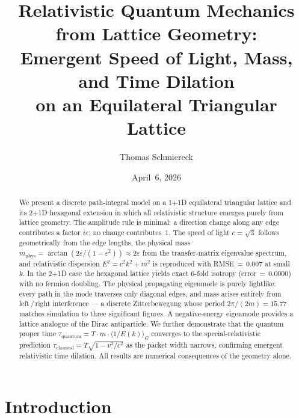 \documentclass[twocolumn,showpacs,preprintnumbers,amsmath,amssymb]{revtex4-2}
\newcommand{\eps}{\varepsilon}
\newcommand{\mphys}{m_{\mathrm{phys}}}
\newcommand{\tauq}{\tau_{\mathrm{quantum}}}
\newcommand{\taucl}{\tau_{\mathrm{classical}}}
\newcommand{\avg}[1]{\langle #1 \rangle}
\begin{document}

\title{Relativistic Quantum Mechanics from Lattice Geometry:\\
Emergent Speed of Light, Mass, and Time Dilation\\
on an Equilateral Triangular Lattice}

\author{Thomas Schmiereck}

\date{April~6, 2026}

\begin{abstract}
We present a discrete path-integral model on a \mbox{1\!+\!1D} equilateral
triangular lattice and its \mbox{2\!+\!1D} hexagonal extension in which all
relativistic structure emerges purely from lattice geometry.
The amplitude rule is minimal: a direction change along any edge contributes a
factor $i\eps$; no change contributes~$1$.
The speed of light $c = \sqrt{3}$ follows geometrically from the edge lengths,
the physical mass $\mphys = \arctan(2\eps/(1{-}\eps^2)) \approx 2\eps$ from
the transfer-matrix eigenvalue spectrum, and relativistic dispersion
$E^2 = c^2 k^2 + m^2$ is reproduced with RMSE\,$=\,0.007$ at small~$k$.
In the \mbox{2\!+\!1D} case the hexagonal lattice yields exact 6-fold isotropy
(error\,$=\,0.0000$) with no fermion doubling.
The physical propagating eigenmode is purely lightlike: every path in the
mode traverses only diagonal edges, and mass arises entirely from
left\,/\,right interference --- a discrete Zitterbewegung whose period
$2\pi/(2m) = 15.77$ matches simulation to three significant figures.
A negative-energy eigenmode provides a lattice analogue of the Dirac
antiparticle.
We further demonstrate that the quantum proper time
$\tauq = T \cdot m \cdot \avg{1/E(k)}_G$ converges to the
special-relativistic prediction $\taucl = T\sqrt{1 - v^2/c^2}$
as the packet width narrows, confirming emergent relativistic time dilation.
All results are numerical consequences of the geometry alone.
\end{abstract}

\maketitle

\section{Introduction}
\label{sec:intro}
\end{document}
